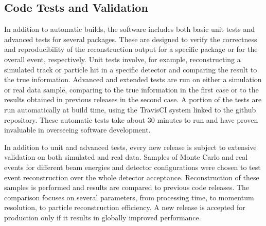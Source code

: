 \subsection{Code Tests and Validation}
\label{sec:tests}

In addition to automatic builds, the software includes both basic unit tests and advanced tests for several
packages. These are designed to verify the correctness and reproducibility of the reconstruction output for a
specific package or for the overall event, respectively. Unit tests involve, for example, reconstructing a simulated
track or particle hit in a specific detector and comparing the result to the true information. Advanced and extended
tests are run on either a simulation or real data sample, comparing to the true information in the first case or to the
results obtained in previous releases in the second case. A portion of the tests are run automatically at build time,
using the TravisCI system linked to the github repository.  These automatic tests take about 30 minutes to run and
have proven invaluable in overseeing software development.

In addition to unit and advanced tests, every new release is subject to extensive validation on both simulated and
real data. Samples of Monte Carlo and real events for different beam energies and detector configurations were
chosen to test event reconstruction over the whole detector acceptance. Reconstruction of these samples is
performed and results are compared to previous code releases. The comparison focuses on several parameters, from
processing time, to momentum resolution, to particle reconstruction efficiency. A new release is accepted for
production only if it results in globally improved performance. 
